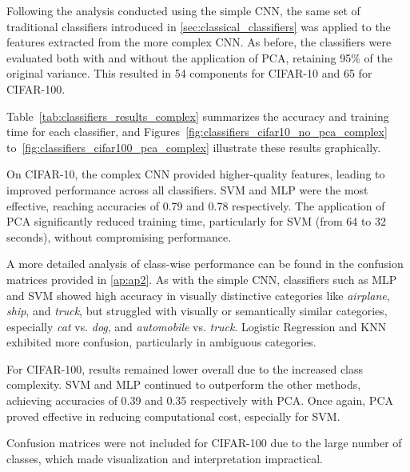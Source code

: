 \documentclass[journal,article,submit,pdftex,moreauthors]{Definitions/mdpi}
\begin{document}
Following the analysis conducted using the simple CNN, the same set of traditional classifiers introduced in \autoref{sec:classical_classifiers} was applied to the features extracted from the more complex CNN. As before, the classifiers were evaluated both with and without the application of PCA, retaining 95\% of the original variance. This resulted in 54 components for CIFAR-10 and 65 for CIFAR-100.

Table~\ref{tab:classifiers_results_complex} summarizes the accuracy and training time for each classifier, and Figures~\ref{fig:classifiers_cifar10_no_pca_complex} to~\ref{fig:classifiers_cifar100_pca_complex} illustrate these results graphically.

On CIFAR-10, the complex CNN provided higher-quality features, leading to improved performance across all classifiers. SVM and MLP were the most effective, reaching accuracies of 0.79 and 0.78 respectively. The application of PCA significantly reduced training time, particularly for SVM (from 64 to 32 seconds), without compromising performance.

A more detailed analysis of class-wise performance can be found in the confusion matrices provided in \autoref{ap:ap2}. As with the simple CNN, classifiers such as MLP and SVM showed high accuracy in visually distinctive categories like \textit{airplane}, \textit{ship}, and \textit{truck}, but struggled with visually or semantically similar categories, especially \textit{cat} vs. \textit{dog}, and \textit{automobile} vs. \textit{truck}. Logistic Regression and KNN exhibited more confusion, particularly in ambiguous categories.

For CIFAR-100, results remained lower overall due to the increased class complexity. SVM and MLP continued to outperform the other methods, achieving accuracies of 0.39 and 0.35 respectively with PCA. Once again, PCA proved effective in reducing computational cost, especially for SVM.

Confusion matrices were not included for CIFAR-100 due to the large number of classes, which made visualization and interpretation impractical.
\end{document}
